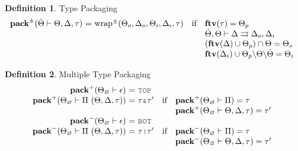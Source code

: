 \documentclass[acmsmall]{acmart}
\theoremstyle{definition}
\newtheorem{definition}{Definition}[section]
\begin{document}

\begin{definition}
  \label{def:type_packaging}
  Type Packaging 
  \hfill
  \\
  \[
  \begin{array}[t]{r@{}c@{}lcl}
      \textbf{pack}^\pm(\dTheta \entails \Theta, \Delta, \tau) 
      &\ =\ & 
      \text{wrap}^{\pm}(\Theta_o, \Delta_o, \Theta_i, \Delta_i, \tau)
      &\text{if}& 
      \begin{array}[t]{@{}l}
        \textbf{ftv}(\tau) = \Theta_p
        \\
        \dTheta, \Theta \entails \Delta \rightrightarrows \Delta_o, \Delta_i 
        \\
        (\textbf{ftv}(\Delta) \cup \Theta_p) \cap \Theta = \Theta_o 
        \\
        \textbf{ftv}(\Delta_i) \cup \Theta_p \backslash \Theta \backslash \dTheta = \Theta_i 
      \end{array}
  \end{array}
  \]
\end{definition}


\begin{definition}
  \label{def:multiple_type_packaging}
  Multiple Type Packaging 
  \hfill
  \ 
  \\
  \[
  \begin{array}[t]{r@{}c@{}lcl}
      \textbf{pack}^+(\Theta_\ignore \entails \epsilon) 
      &\ =\ & 
      \J{TOP} 

      \\

      \textbf{pack}^+(\Theta_\ignore \entails \Pi\ (\Theta, \Delta, \tau)) 
      &\ =\ & 
      \tau \J{\&} \tau' 
      &\text{if}& 
      \begin{array}[t]{@{}l}
        \textbf{pack}^+(\Theta_\ignore \entails \Pi) = \tau 
        \\
        \textbf{pack}^+(\Theta_\ignore \entails \Theta, \Delta, \tau) = \tau'
      \end{array}

      \\

      \textbf{pack}^-(\Theta_\ignore \entails \epsilon) 
      &\ =\ & 
      \J{BOT} 

      \\

      \textbf{pack}^-(\Theta_\ignore \entails \Pi\ (\Theta, \Delta, \tau))
      &\ =\ & 
      \tau \J{|} \tau' 
      &\text{if}& 
      \begin{array}[t]{@{}l}
        \textbf{pack}^-(\Theta_\ignore \entails \Pi) = \tau 
        \\
        \textbf{pack}^-(\Theta_\ignore \entails \Theta, \Delta, \tau) = \tau'
      \end{array}
  \end{array}
  \]
\end{definition}
\end{document}
